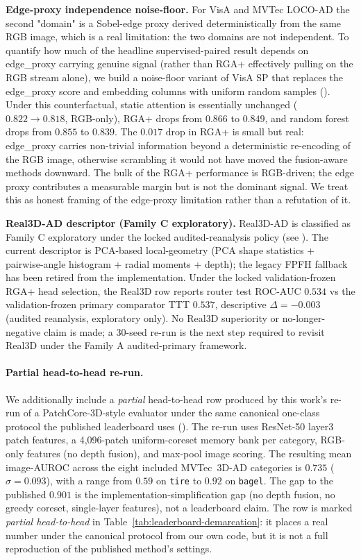 \documentclass[10pt,conference]{IEEEtran}
\newcommand{\methodplus}{RGA+}
\begin{document}
\noindent\textbf{Edge-proxy independence noise-floor.}
For VisA and MVTec LOCO-AD the second "domain" is a Sobel-edge proxy
derived deterministically from the same RGB image, which is a real
limitation: the two domains are not independent. To quantify how much
of the headline supervised-paired result depends on edge\_proxy
carrying genuine signal (rather than RGA+ effectively pulling on the
RGB stream alone), we build a noise-floor variant of VisA SP that
replaces the edge\_proxy score and embedding columns with uniform
random samples
(). Under this
counterfactual, static attention is essentially unchanged
($0.822 \to 0.818$, RGB-only), \methodplus{} drops from $0.866$ to
$0.849$, and random forest drops from $0.855$ to $0.839$. The
$0.017$ drop in \methodplus{} is small but real: edge\_proxy
carries non-trivial information beyond a deterministic re-encoding of
the RGB image, otherwise scrambling it would not have moved the
fusion-aware methods downward. The bulk of the \methodplus{}
performance is RGB-driven; the edge proxy contributes a measurable
margin but is not the dominant signal. We treat this as
honest framing of the edge-proxy limitation rather than a refutation
of it.

\noindent\textbf{Real3D-AD descriptor (Family C exploratory).}
Real3D-AD is classified as Family C exploratory under the locked
audited-reanalysis policy (see
). The current
descriptor is PCA-based local-geometry (PCA shape statistics +
pairwise-angle histogram + radial moments + depth); the legacy FPFH
fallback has been retired from the implementation. Under the locked
validation-frozen RGA+ head selection, the Real3D row reports router
test ROC-AUC $0.534$ vs the validation-frozen primary comparator TTT
$0.537$, descriptive $\Delta = -0.003$ (audited reanalysis,
exploratory only). No Real3D superiority or no-longer-negative claim
is made; a 30-seed re-run is the next step required to revisit Real3D
under the Family A audited-primary framework.

\paragraph{Partial head-to-head re-run.} We additionally include a
\emph{partial} head-to-head row produced by this work's re-run of a
PatchCore-3D-style evaluator under the same canonical one-class
protocol the published leaderboard uses
(). The re-run uses
ResNet-50 layer3 patch features, a 4{,}096-patch uniform-coreset
memory bank per category, RGB-only features (no depth fusion), and
max-pool image scoring. The resulting mean image-AUROC across the eight
included MVTec~3D-AD categories is $0.735$ ($\sigma = 0.093$), with a
range from $0.59$ on \texttt{tire} to $0.92$ on \texttt{bagel}. The
gap to the published $0.901$ is the implementation-simplification gap
(no depth fusion, no greedy coreset, single-layer features), not a
leaderboard claim. The row is marked \emph{partial head-to-head} in
Table~\ref{tab:leaderboard-demarcation}: it places a real number under the
canonical protocol from our own code, but it is not a full
reproduction of the published method's settings.
\end{document}

